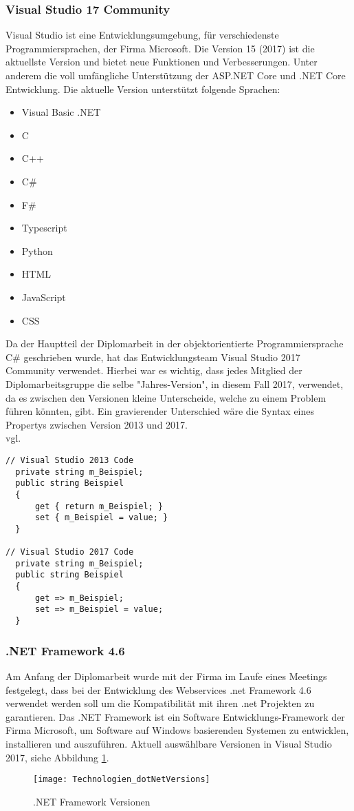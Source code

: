 \subsubsection{Visual Studio 17 Community}
\label{sec:VisualStudio17Community}
Visual Studio ist eine Entwicklungsumgebung, für verschiedenste Programmiersprachen, der Firma Microsoft. Die Version 15 (2017) ist die aktuellste Version und bietet neue Funktionen und Verbesserungen. Unter anderem die voll umfängliche Unterstützung der ASP.NET Core und .NET Core Entwicklung. Die aktuelle Version unterstützt folgende Sprachen:
\begin{itemize}
\item Visual Basic .NET
\item C
\item C++
\item C\#
\item F\#
\item Typescript
\item Python
\item HTML
\item JavaScript
\item CSS
\end{itemize}
Da der Hauptteil der Diplomarbeit in der objektorientierte Programmiersprache C\# geschrieben wurde, hat das Entwicklungsteam Visual Studio 2017 Community verwendet. Hierbei war es wichtig, dass jedes Mitglied der Diplomarbeitsgruppe die selbe "Jahres-Version", in diesem Fall 2017, verwendet, da es zwischen den Versionen kleine Unterscheide, welche zu einem Problem führen könnten, gibt. Ein gravierender Unterschied wäre die Syntax eines Propertys zwischen Version 2013 und 2017. \\vgl. \cite{visualstudio}
\begin{lstlisting}[caption=Syntax Unterschied: Property , label=lst:test]
// Visual Studio 2013 Code
  private string m_Beispiel;
  public string Beispiel
  {
      get { return m_Beispiel; }
      set { m_Beispiel = value; }
  }

// Visual Studio 2017 Code
  private string m_Beispiel;
  public string Beispiel
  {
      get => m_Beispiel;
      set => m_Beispiel = value;
  }
\end{lstlisting}

\subsubsection{.NET Framework 4.6}
\label{sec:.NETFramework4.6}
Am Anfang der Diplomarbeit wurde mit der Firma im Laufe eines Meetings festgelegt, dass bei der Entwicklung des Webservices .net Framework 4.6 verwendet werden soll um die Kompatibilität mit ihren .net Projekten zu garantieren.
Das .NET Framework ist ein Software Entwicklungs-Framework der Firma Microsoft, um Software auf Windows basierenden Systemen zu entwicklen, installieren und auszuführen. 
Aktuell auswählbare Versionen in Visual Studio 2017, siehe Abbildung \ref{fig:netFramework}.\\ 
\begin{figure}[H]
	\centering
    \texttt{[image: Technologien\_dotNetVersions]}
    \caption{.NET Framework Versionen}
    \label{fig:netFramework}
\end{figure}
\justifying
